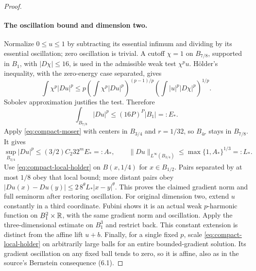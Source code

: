 \begin{proof}
\paragraph{The oscillation bound and dimension two.}
Normalize $0\leq u\leq1$ by subtracting its essential infimum and
dividing by its essential oscillation; zero oscillation is trivial.
A cutoff $\chi=1$ on $B_{7/8}$, supported in $B_1$, with
$|D\chi|\leq16$, is used in the admissible weak test $\chi^pu$.
H\"older's inequality, with the zero-energy case separated, gives
\[
 \int\chi^p|Du|^p\leq
 p\left(\int\chi^p|Du|^p\right)^{(p-1)/p}
   \left(\int|u|^p|D\chi|^p\right)^{1/p}.
\]
Sobolev approximation justifies the test. Therefore
\[
 \int_{B_{7/8}}|Du|^p\leq(16P)^P|B_1|=:E_*.
\]
Apply \eqref{eq:compact-moser} with centers in $B_{3/4}$ and
$r=1/32$, so $B_{4r}$ stays in $B_{7/8}$. It gives
\[
 \sup_{B_{3/4}}|Du|^p\leq(3/2)C_2 32^m E_*=:A_*,\qquad
 \|Du\|_{L^\infty(B_{3/4})}\leq\max\{1,A_*\}^{1/3}=:L_*.
\]
Use \eqref{eq:compact-local-holder} on $B(x,1/4)$ for
$x\in B_{1/2}$. Pairs separated by at most $1/8$ obey that local
bound; more distant pairs obey
$|Du(x)-Du(y)|\leq2\,8^\theta L_*|x-y|^\theta$. This proves the
claimed gradient norm and full seminorm after restoring oscillation.
For original dimension two, extend $u$ constantly in a third
coordinate. Fubini shows it is an actual weak $p$-harmonic function
on $B_1^2\times\mathbb R$, with the same gradient norm and oscillation.
Apply the three-dimensional estimate on $B_1^3$ and restrict back.
This constant extension is distinct from the affine lift $u+b$.
Finally, for a single fixed $p$, scale
\eqref{eq:compact-local-holder} on arbitrarily large balls for an
entire bounded-gradient solution. Its gradient oscillation on any
fixed ball tends to zero, so it is affine, also as in the source's
Bernstein consequence (6.1).
\end{proof}
